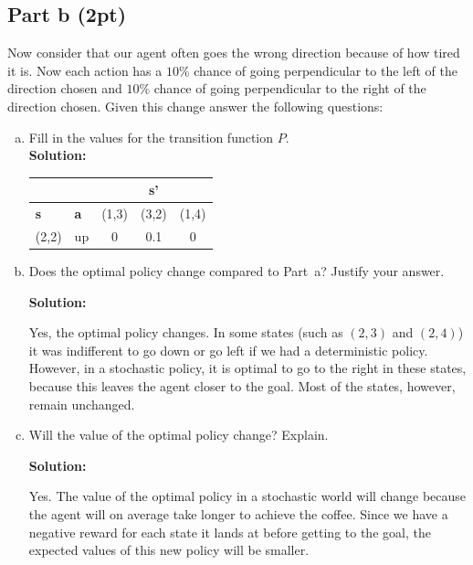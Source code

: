 \documentclass[12pt]{article}
\begin{document}
\subsection*{Part b (2pt)}

Now consider that our agent often goes the wrong direction because of
how tired it is. Now each action has a $10\%$ chance of going
perpendicular to the left of the direction chosen and $10\%$ chance of
going perpendicular to the right of the direction chosen. Given this
change answer the following questions:

\begin{enumerate}[a)]
\item Fill in the values for the transition function $P$.\\

\textbf{Solution:}


    \begin{center}
    \begin{tabular}{|l|l|c|c|c|}\hline
      \multicolumn{2}{|c|}{} &
                               \multicolumn{3}{|c|}{\textbf{s'}}\\\hline
      \textbf{s} & \textbf{a} & (1,3) & (3,2) & (1,4)\\\hline
      (2,2) & up & 0 & 0.1 & 0 \\ \hline
    \end{tabular}
  \end{center}
\item Does the optimal policy change compared to Part~a? Justify your
  answer.

  \textbf{Solution:}

Yes, the optimal policy changes. In some states (such as $(2,3)$ and $(2,4)$) it was indifferent to go down or go left if we had a deterministic policy. However, in a stochastic policy, it is optimal to go to the right in these states, because this leaves the agent closer to the goal. 
Most of the states, however, remain unchanged.

\item Will the value of the optimal policy change? Explain.

\textbf{Solution:}

Yes. The value of the optimal policy in a stochastic world will change because the agent will on average take longer to achieve the coffee. Since we have a negative reward for each state it lands at before getting to the goal, the expected values of this new policy will be smaller.


\end{enumerate}
\end{document}
